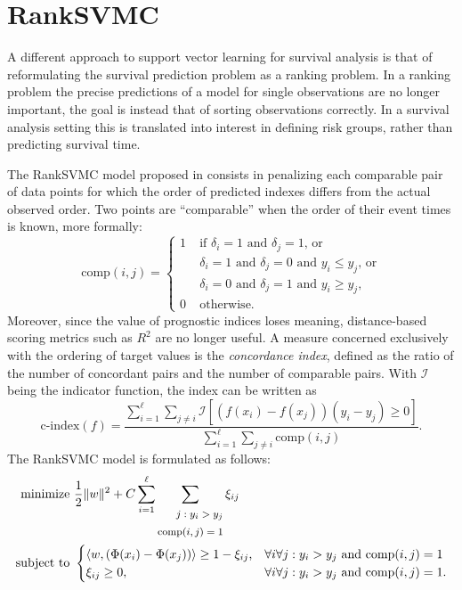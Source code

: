 \documentclass[12pt]{report}
\begin{document}
\section{RankSVMC}
A different approach to support vector learning for survival analysis is that of reformulating the survival prediction problem as a ranking problem. In a ranking problem the precise predictions of a model for single observations are no longer important, the goal is instead that of sorting observations correctly. In a survival analysis setting this is translated into interest in defining risk groups, rather than predicting survival time.

The RankSVMC model proposed in \cite{vanbelle07,evers08} consists in penalizing each comparable pair of data points for which the order of predicted indexes differs from the actual observed order. Two points are ``comparable'' when the order of their event times is known, more formally:
\begin{equation} \label{comparable}
\text{comp}(i,j) = \begin{cases}
1 \; &\text{if } \delta_{i} = 1 \text{ and } \delta_{j} = 1 \text{, or}\\
&\delta_{i} = 1 \text{ and } \delta_{j} = 0 \text{ and } y_{i} \leq y_{j} \text{, or}\\
&\delta_{i} = 0 \text{ and } \delta_{j} = 1 \text{ and } y_{i} \geq y_{j} \text{,}\\
0 \; &\text{otherwise.}
\end{cases}
\end{equation}
Moreover, since the value of prognostic indices loses meaning, distance-based scoring metrics such as $R^2$ are no longer useful. A measure concerned exclusively with the ordering of target values is the \textit{concordance index}, defined as the ratio of the number of concordant pairs and the number of comparable pairs. With $\mathcal{I}$ being the indicator function, the index can be written as
\begin{equation} \label{c-index}
\text{c-index}(f) = \dfrac{\sum_{i=1}^{\ell}\sum_{j \neq i}\mathcal{I}[(f(x_{i})-f(x_{j}))(y_{i}-y_{j}) \geq 0]}{\sum_{i=1}^{\ell}\sum_{j\neq i}\text{comp}(i,j)} \text{.}
\end{equation}
The RankSVMC model is formulated as follows:
\begin{equation} \label{ranksvmcprimal}
\begin{split}
\text{minimize} &\ \dfrac{1}{2}\| w \|^2 + C\sum_{i=1}^{\ell}\sum_{\footnotesize\begin{split} j:y_{i} > y_{j} \\ \text{comp}(i,j) = 1 \end{split}}\xi_{ij} \\
\text{subject to} &\ \begin{cases}
\langle w,(\Phi(x_{i}) - \Phi(x_{j})) \rangle \geq 1 - \xi_{ij} \text{,} &\forall i \forall j : y_{i} > y_{j} \text{ and comp}(i,j) = 1\\
\xi_{ij} \geq 0 \text{,} &\forall i \forall j : y_{i} > y_{j} \text{ and comp}(i,j) = 1 \text{.}
\end{cases}
\end{split}
\end{equation}
\end{document}
